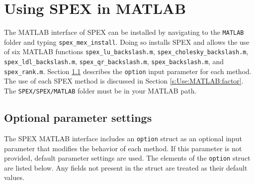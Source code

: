 \documentclass[12pt,oneside]{book}
\theoremstyle{definition}
\begin{document}
\chapter{Using SPEX in MATLAB}\vspace{-0.75in} \label{s:Use:MATLAB}
The MATLAB interface of SPEX can be installed by navigating to the \verb|MATLAB| folder and typing \verb|spex_mex_install|. 
Doing so installs SPEX and allows the use of six MATLAB functions \verb|spex_lu_backslash.m|, \verb|spex_cholesky_backslash.m|, \verb|spex_ldl_backslash.m|, \verb|spex_qr_backslash.m|, \verb|spex_backslash.m|, and \verb|spex_rank.m|. Section \ref{s:Use:MATLAB:setup} describes the
\verb|option| input parameter for each method.
The use of each SPEX method is discussed in Section \ref{s:Use:MATLAB:factor}.
The \verb|SPEX/SPEX/MATLAB| folder must be in your MATLAB path.

\section{Optional parameter settings} \label{s:Use:MATLAB:setup}
The SPEX MATLAB interface includes an \verb|option| struct as an optional
input parameter that modifies the behavior of each method.  If this parameter is not provided,
default parameter settings are used.  The elements of the \verb'option' struct
are listed below.  Any fields not present in the struct are treated as their
default values.
\end{document}
